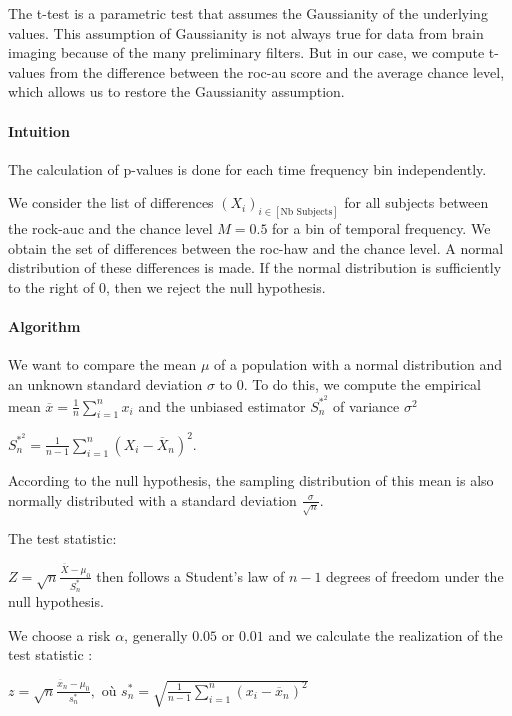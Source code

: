 The t-test is a parametric test that assumes the Gaussianity of the underlying values. This assumption of Gaussianity is not always true for data from brain imaging because of the many preliminary filters. But in our case, we compute t-values from the difference between the roc-au score and the average chance level, which allows us to restore the Gaussianity assumption.

\paragraph{Intuition}

The calculation of p-values is done for each time frequency bin independently.

We consider the list of differences $(X_i)_{i \in [\text{Nb Subjects}]}$ for all subjects between the rock-auc and the chance level $M=0.5$ for a bin of temporal frequency. We obtain the set of differences between the roc-haw and the chance level. A normal distribution of these differences is made. If the normal distribution is sufficiently to the right of 0, then we reject the null hypothesis.

\paragraph{Algorithm}

We want to compare the mean $\mu$ of a population with a normal distribution and an unknown standard deviation $\sigma$ to $0$. To do this, we compute the empirical mean $\overline{x} = \frac{1}{n}\sum_{i=1}^{n}x_i$ and the unbiased estimator $S^{\ast ^2}_n$ of variance $\sigma^2$

$S^{\ast ^2}_n = \frac{1}{n-1}\sum\limits_{i=1}^n (X_i - \overline X_n )^2$.

According to the null hypothesis, the sampling distribution of this mean is also normally distributed with a standard deviation $\frac{\sigma}{\sqrt{n}}$.

The test statistic:

$ Z = \sqrt{n}\frac{\overline{X} - \mu_0}{S^{\ast}_n}$
then follows a Student's law of $n-1$ degrees of freedom under the null hypothesis.

We choose a risk $\alpha$, generally $0.05$ or $0.01$ and we calculate the realization of the test statistic :

$z = \sqrt{n}\frac{\overline{x}_n - \mu_0}{s^{\ast}_n},$ où $s^{\ast}_n =\sqrt{\frac{1}{n-1}\sum\limits_{i=1}^n (x_i - \overline x_n )^2} $

